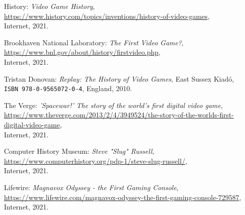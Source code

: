
\begin{thebibliography}{x}

	
	History: \emph{Video Game History}, \\
	\url{https://www.history.com/topics/inventions/history-of-video-games}, \\
	Internet, 2021.
	
	Brookhaven National Laboratory: \emph{The First Video Game?}, \\
	\url{https://www.bnl.gov/about/history/firstvideo.php}, \\
	Internet, 2021.
	
	Tristan Donovan: \emph{Replay: The History of Video Games},
	East Sussex Kiadó, \\
	\texttt{ISBN 978-0-9565072-0-4}, England, 2010.
	
	The Verge: \emph{'Spacewar!' The story of the world's first digital video game}, \\
	\url{https://www.theverge.com/2013/2/4/3949524/the-story-of-the-worlds-first-digital-video-game}, \\
	Internet, 2021.
	
	Computer History Museum: \emph{Steve "Slug" Russell}, \\
	\url{https://www.computerhistory.org/pdp-1/steve-slug-russell/}, \\
	Internet, 2021.
	
	Lifewire: \emph{Magnavox Odyssey - the First Gaming Console}, \\
	\url{https://www.lifewire.com/magnavox-odyssey-the-first-gaming-console-729587}, \\
	Internet, 2021.
	

\end{thebibliography}
